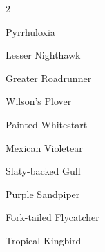 \documentclass[10pt,letterpaper]{article}
\begin{document}
\begin{multicols}{2}
	\begin{etaremune}
		\item Pyrrhuloxia
		\item Lesser Nighthawk
		\item Greater Roadrunner
		\item Wilson's Plover
		\item Painted Whitestart
		\item Mexican Violetear
		\item Slaty-backed Gull
		\item Purple Sandpiper
		\item Fork-tailed Flycatcher
		\item Tropical Kingbird
	\end{etaremune}
	
\end{multicols}

\printbibliography[heading=bibintoc,title={References}]

\end{document}
